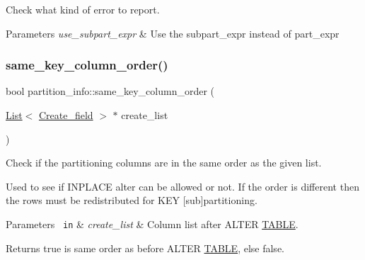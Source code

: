 Check what kind of error to report.


\begin{DoxyParams}{Parameters}
{\em use\+\_\+subpart\+\_\+expr} & Use the subpart\+\_\+expr instead of part\+\_\+expr \\
\hline
\end{DoxyParams}
\mbox{\label{classpartition__info_aee6a2a93cef622dc6707a744525ea704}} 
\subsubsection{\texorpdfstring{same\+\_\+key\+\_\+column\+\_\+order()}{same\_key\_column\_order()}}
{\footnotesize\ttfamily bool partition\+\_\+info\+::same\+\_\+key\+\_\+column\+\_\+order (\begin{DoxyParamCaption}\item[{\mbox{\hyperlink{classList}{List}}$<$ \mbox{\hyperlink{classCreate__field}{Create\+\_\+field}} $>$ $\ast$}]{create\+\_\+list }\end{DoxyParamCaption})}

Check if the partitioning columns are in the same order as the given list.

Used to see if I\+N\+P\+L\+A\+CE alter can be allowed or not. If the order is different then the rows must be redistributed for K\+EY \mbox{[}sub\mbox{]}partitioning.


\begin{DoxyParams}[1]{Parameters}
\mbox{\texttt{ in}}  & {\em create\+\_\+list} & Column list after A\+L\+T\+ER \mbox{\hyperlink{structTABLE}{T\+A\+B\+LE}}. \\
\hline
\end{DoxyParams}
\begin{DoxyReturn}{Returns}
true is same order as before A\+L\+T\+ER \mbox{\hyperlink{structTABLE}{T\+A\+B\+LE}}, else false. 
\end{DoxyReturn}
\mbox{\label{classpartition__info_ae85efb249bbcbe50f9ab3a77c120baae}} 

